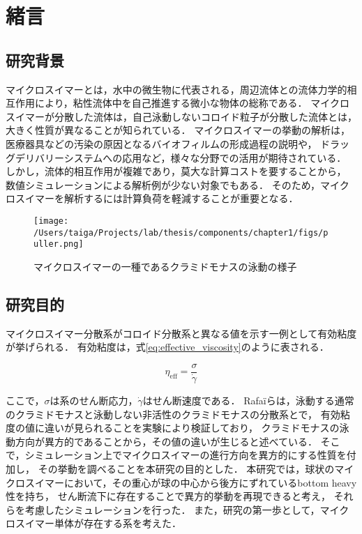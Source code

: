\documentclass[11pt, a4j, dvipdfmx]{jarticle}
\begin{document}
\section{緒言}
\label{sec:introduction}


\subsection{研究背景}
\par
マイクロスイマーとは，水中の微生物に代表される，周辺流体との流体力学的相互作用により，粘性流体中を自己推進する微小な物体の総称である．
マイクロスイマーが分散した流体は，自己泳動しないコロイド粒子が分散した流体とは，大きく性質が異なることが知られている．
マイクロスイマーの挙動の解析は，医療器具などの汚染の原因となるバイオフィルムの形成過程の説明や，
ドラッグデリバリーシステムへの応用など，様々な分野での活用が期待されている．
しかし，流体的相互作用が複雑であり，莫大な計算コストを要することから，
数値シミュレーションによる解析例が少ない対象でもある．
そのため，マイクロスイマーを解析するには計算負荷を軽減することが重要となる．

    \begin{figure}[htbp]
        \centering
        \texttt{[image: /Users/taiga/Projects/lab/thesis/components/chapter1/figs/puller.png]}
        \caption{マイクロスイマーの一種であるクラミドモナスの泳動の様子\cite{Chlamydomonas}}
    \end{figure}


\subsection{研究目的}
\label{sec:purpose}

\par
マイクロスイマー分散系がコロイド分散系と異なる値を示す一例として有効粘度が挙げられる．
有効粘度は，式\eqref{eq:effective_viscosity}のように表される．

    \begin{equation}
        \eta_\mathrm{eff} = \frac{\sigma}{\dot{\gamma}}
        \label{eq:effective_viscosity}
    \end{equation}

\noindent
ここで，$\sigma$は系のせん断応力，$\dot{\gamma}$はせん断速度である．
Rafa\"iらは，泳動する通常のクラミドモナスと泳動しない非活性のクラミドモナスの分散系とで，
有効粘度の値に違いが見られることを実験により検証しており，
クラミドモナスの泳動方向が異方的であることから，その値の違いが生じると述べている\cite{effective_viscosity}．
そこで，シミュレーション上でマイクロスイマーの進行方向を異方的にする性質を付加し，
その挙動を調べることを本研究の目的とした．
本研究では，球状のマイクロスイマーにおいて，その重心が球の中心から後方にずれているbottom heavy性を持ち，
せん断流下に存在することで異方的挙動を再現できると考え，
それらを考慮したシミュレーションを行った．
また，研究の第一歩として，マイクロスイマー単体が存在する系を考えた．
\end{document}
